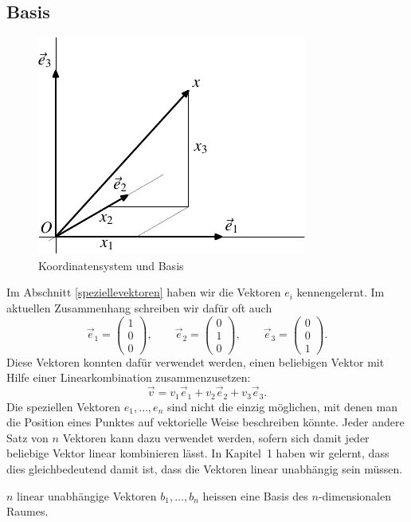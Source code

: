\subsection{Basis}
\begin{figure}
\begin{center}
\includegraphics{images/v-5}
\end{center}
\caption{Koordinatensystem und Basis\label{imagebasis}}
\end{figure}
Im Abschnitt \ref{speziellevektoren} haben wir die Vektoren $e_i$
kennengelernt.
Im aktuellen Zusammenhang schreiben wir dafür oft auch
\[
\vec e_1=\begin{pmatrix}1\\0\\0\end{pmatrix},\qquad
\vec e_2=\begin{pmatrix}0\\1\\0\end{pmatrix},\qquad
\vec e_3=\begin{pmatrix}0\\0\\1\end{pmatrix}.
\]
Diese Vektoren konnten dafür verwendet werden, einen beliebigen Vektor
mit Hilfe einer Linearkombination zusammenzusetzen:
\[
\vec v=
v_1\vec e_1+
v_2\vec e_2+
v_3\vec e_3.
\]
Die speziellen Vektoren $e_1,\dots,e_n$ sind nicht die einzig möglichen,
mit denen man die Position eines Punktes auf vektorielle Weise
beschreiben könnte.
Jeder andere Satz von $n$ Vektoren kann
dazu verwendet werden, sofern sich damit jeder beliebige Vektor
linear kombinieren lässt.
In Kapitel~1 haben wir gelernt, dass dies
gleichbedeutend damit ist, dass die Vektoren linear unabhängig sein
müssen.
\begin{definition}
$n$ linear unabhängige Vektoren $b_1,\dots,b_n$ heissen eine
Basis des $n$-dimensionalen Raumes.
\end{definition}
